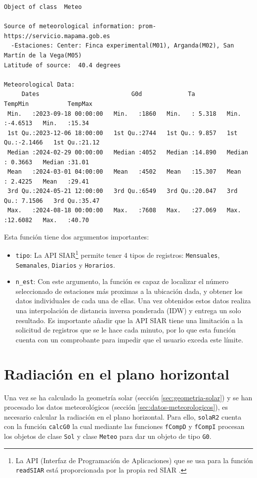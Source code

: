 \begin{verbatim}
Object of class  Meteo 

Source of meteorological information: prom-https://servicio.mapama.gob.es 
  -Estaciones: Center: Finca experimental(M01), Arganda(M02), San Martín de la Vega(M05) 
Latitude of source:  40.4 degrees

Meteorological Data:
     Dates                          G0d             Ta            TempMin           TempMax     
 Min.   :2023-09-18 00:00:00   Min.   :1860   Min.   : 5.318   Min.   :-4.6513   Min.   :15.34  
 1st Qu.:2023-12-06 18:00:00   1st Qu.:2744   1st Qu.: 9.857   1st Qu.:-2.1466   1st Qu.:21.12  
 Median :2024-02-29 00:00:00   Median :4052   Median :14.890   Median : 0.3663   Median :31.01  
 Mean   :2024-03-01 04:00:00   Mean   :4502   Mean   :15.307   Mean   : 2.4225   Mean   :29.41  
 3rd Qu.:2024-05-21 12:00:00   3rd Qu.:6549   3rd Qu.:20.047   3rd Qu.: 7.1506   3rd Qu.:35.47  
 Max.   :2024-08-18 00:00:00   Max.   :7608   Max.   :27.069   Max.   :12.6082   Max.   :40.70
\end{verbatim}

Esta función tiene dos argumentos importantes:
\begin{itemize}
\item \texttt{tipo}: La API SIAR\footnote{La API (Interfaz de Programación de Aplicaciones) que se usa para la función \texttt{readSIAR} está proporcionada por la propia red SIAR \cite{siar23}.} permite tener 4 tipos de registros: \texttt{Mensuales}, \texttt{Semanales}, \texttt{Diarios} y \texttt{Horarios}.
\item \texttt{n\_est}: Con este argumento, la función es capaz de localizar el número seleccionado de estaciones más proximas a la ubicación dada, y obtener los datos individuales de cada una de ellas. Una vez obtenidos estos datos realiza una interpolación de distancia inversa ponderada (IDW) y entrega un solo resultado. Es importante añadir que la API SIAR tiene una limitación a la solicitud de registros que se le hace cada minuto, por lo que esta función cuenta con un comprobante para impedir que el usuario exceda este límite.
\end{itemize}

\section{Radiación en el plano horizontal}
\label{sec:org62ae912}
\label{sec:radiacion-plano-horizontal}
Una vez se ha calculado la geometría solar (sección \ref{sec:geometria-solar}) y se han procesado los datos meteorológicos (sección \ref{sec:datos-meteorologicos}), es necesario calcular la radiación en el plano horizontal. Para ello, \texttt{solaR2} cuenta con la función \texttt{calcG0} la cual mediante las funciones \texttt{fCompD} y \texttt{fCompI} procesan los objetos de clase \texttt{Sol} y clase \texttt{Meteo} para dar un objeto de tipo \texttt{G0}.

